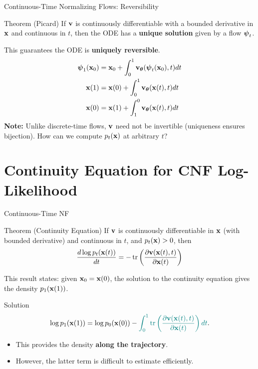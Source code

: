 \documentclass{beamer}
\begin{document}
\begin{frame}{Continuous-Time Normalizing Flows: Reversibility}
	\begin{block}{Theorem (Picard)}
		If $\mathbf{v}$ is continuously differentiable with a bounded derivative in $\mathbf{x}$ and continuous in $t$, then the ODE has a \textbf{unique solution} given by a flow $\boldsymbol{\psi}_t$.
	\end{block}
	\eqpause
	This guarantees the ODE is \textbf{uniquely reversible}. 
	\vspace{-0.3cm}
	\begin{align*}
		\boldsymbol{\psi}_1(\mathbf{x}_0) &= \mathbf{x}_0 + \int_{0}^{1} \mathbf{v}_{\boldsymbol{\theta}}(\boldsymbol{\psi}_t(\mathbf{x}_0), t) dt \\
		\mathbf{x}(1) &= \mathbf{x}(0) + \int_{0}^{1} \mathbf{v}_{\boldsymbol{\theta}}(\mathbf{x}(t), t) dt \\
		\mathbf{x}(0) &= \mathbf{x}(1) + \int_{1}^{0} \mathbf{v}_{\boldsymbol{\theta}}(\mathbf{x}(t), t) dt
	\end{align*}
	\eqpause
	\textbf{Note:} Unlike discrete-time flows, $\mathbf{v}$ need not be invertible (uniqueness ensures bijection).
	\eqpause
	How can we compute $p_t(\mathbf{x})$ at arbitrary $t$?
\end{frame}
\section{Continuity Equation for CNF Log-Likelihood}
\begin{frame}{Continuous-Time NF}
	\begin{block}{Theorem (Continuity Equation)}
		If $\mathbf{v}$ is continuously differentiable in $\mathbf{x}$ (with bounded derivative) and continuous in $t$, and $p_t(\mathbf{x}) > 0$, then
		\[
			\frac{d \log p_t(\mathbf{x}(t))}{d t} = - \operatorname{tr} \left( \frac{\partial \mathbf{v}(\mathbf{x}(t), t)}{\partial \mathbf{x}(t)} \right)
		\]
		\vspace{-0.3cm}
	\end{block}
	\eqpause
	This result states: given $\mathbf{x}_0 = \mathbf{x}(0)$, the solution to the continuity equation gives the density $p_1(\mathbf{x}(1))$.
	\begin{block}{Solution}
		\vspace{-0.3cm}
		\[
			\log p_1(\mathbf{x}(1)) = \log p_0(\mathbf{x}(0)) - {\color{teal}\int_{0}^{1} \operatorname{tr}  \left( \frac{\partial \mathbf{v}(\mathbf{x}(t), t)}{\partial \mathbf{x}(t)} \right) dt}.
		\]
		\vspace{-0.3cm}
	\end{block}
	\eqpause
	\begin{itemize}
		\item This provides the density \textbf{along the trajectory}.
		\item However, {\color{teal}the latter term} is difficult to estimate efficiently.
	\end{itemize}
\end{frame}
\end{document}
